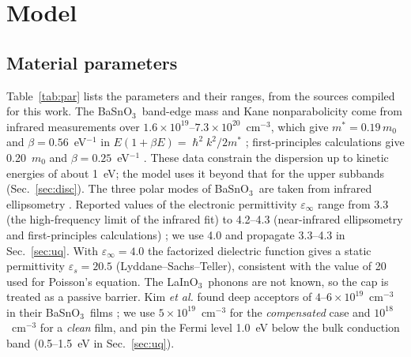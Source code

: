 \documentclass[11pt]{article}
\newcommand{\LIO}{\texorpdfstring{LaInO$_3$}{LaInO3}}
\newcommand{\BSO}{\texorpdfstring{BaSnO$_3$}{BaSnO3}}
\begin{document}
\section{Model}\label{sec:model}
\subsection{Material parameters}
Table~\ref{tab:par} lists the parameters and their ranges, from the sources compiled for this work. The \BSO\ band-edge mass and Kane nonparabolicity come from infrared measurements over $1.6\times10^{19}$--$7.3\times10^{20}$~cm$^{-3}$, which give $m^*=0.19\,m_0$ and $\beta=0.56$~eV$^{-1}$ in $E(1+\beta E)=\hslash^2k^2/2m^*$ \cite{Niedermeier2017}; first-principles calculations give 0.20~$m_0$ and $\beta=0.25$~eV$^{-1}$ \cite{Krishnaswamy2017}. These data constrain the dispersion up to kinetic energies of about 1~eV; the model uses it beyond that for the upper subbands (Sec.~\ref{sec:disc}). The three polar modes of \BSO\ are taken from infrared ellipsometry \cite{Stanislavchuk2012}. Reported values of the electronic permittivity $\varepsilon_\infty$ range from 3.3 (the high-frequency limit of the infrared fit) to 4.2--4.3 (near-infrared ellipsometry and first-principles calculations) \cite{Stanislavchuk2012,Krishnaswamy2017,Aggoune2022}; we use 4.0 and propagate 3.3--4.3 in Sec.~\ref{sec:uq}. With $\varepsilon_\infty=4.0$ the factorized dielectric function gives a static permittivity $\varepsilon_s=20.5$ (Lyddane--Sachs--Teller), consistent with the value of 20 used for Poisson's equation. The \LIO\ phonons are not known, so the cap is treated as a passive barrier. Kim \emph{et al.} found deep acceptors of $4$--$6\times10^{19}$~cm$^{-3}$ in their \BSO\ films \cite{Kim2019LIO}; we use $5\times10^{19}$~cm$^{-3}$ for the \emph{compensated} case and $10^{18}$~cm$^{-3}$ for a \emph{clean} film, and pin the Fermi level 1.0~eV below the bulk conduction band (0.5--1.5~eV in Sec.~\ref{sec:uq}).
\end{document}
